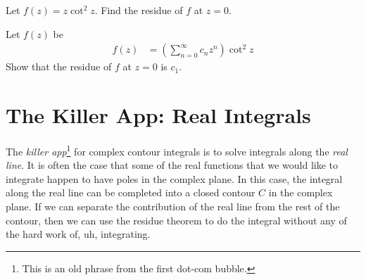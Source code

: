 \begin{exercise}
Let $f(z)=z\cot^2 z$. Find the residue of $f$ at $z=0$. 
\end{exercise}


\begin{exercise}
Let $f(z)$ be
\begin{align}
  f(z) &= \left(\sum_{n=0}^\infty c_n z^n\right)\cot^2 z
\end{align}
Show that the residue of $f$ at $z=0$ is $c_1$.
\end{exercise}



\section{The Killer App: Real Integrals}

The \emph{killer app}\footnote{This is an old phrase from the first dot-com bubble.} for complex contour integrals is to solve integrals along the \emph{real line}. It is often the case that some of the real functions that we would like to integrate happen to have poles in the complex plane. In this case, the integral along the real line can be completed into a closed contour $C$ in the complex plane. If we can separate the contribution of the real line from the rest of the contour, then we can use the residue theorem to do the integral without any of the hard work of, uh, integrating.

